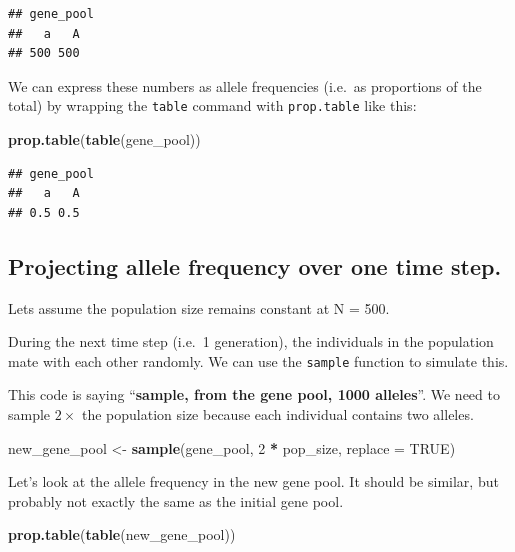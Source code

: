 \documentclass[
  a4paper]{book}
\newenvironment{Shaded}{\begin{snugshade}}{\end{snugshade}}
\newcommand{\AttributeTok}[1]{\textcolor[rgb]{0.13,0.29,0.53}{#1}}
\newcommand{\ConstantTok}[1]{\textcolor[rgb]{0.56,0.35,0.01}{#1}}
\newcommand{\DecValTok}[1]{\textcolor[rgb]{0.00,0.00,0.81}{#1}}
\newcommand{\FunctionTok}[1]{\textcolor[rgb]{0.13,0.29,0.53}{\textbf{#1}}}
\newcommand{\NormalTok}[1]{#1}
\newcommand{\OtherTok}[1]{\textcolor[rgb]{0.56,0.35,0.01}{#1}}
\newcommand{\SpecialCharTok}[1]{\textcolor[rgb]{0.81,0.36,0.00}{\textbf{#1}}}
\begin{document}
\begin{verbatim}
## gene_pool
##   a   A 
## 500 500
\end{verbatim}

We can express these numbers as allele frequencies (i.e.~as proportions of the total) by wrapping the \texttt{table} command with \texttt{prop.table} like this:

\begin{Shaded}
\begin{Highlighting}[]
\FunctionTok{prop.table}\NormalTok{(}\FunctionTok{table}\NormalTok{(gene\_pool))}
\end{Highlighting}
\end{Shaded}

\begin{verbatim}
## gene_pool
##   a   A 
## 0.5 0.5
\end{verbatim}

\hypertarget{projecting-allele-frequency-over-one-time-step.}{%
\subsection{Projecting allele frequency over one time step.}\label{projecting-allele-frequency-over-one-time-step.}}

Lets assume the population size remains constant at N = 500.

During the next time step (i.e.~1 generation), the individuals in the population mate with each other randomly. We can use the \texttt{sample} function to simulate this.

This code is saying ``\textbf{sample, from the gene pool, 1000 alleles}''. We need to sample \(2 \times\) the population size because each individual contains two alleles.

\begin{Shaded}
\begin{Highlighting}[]
\NormalTok{new\_gene\_pool }\OtherTok{\textless{}{-}} \FunctionTok{sample}\NormalTok{(gene\_pool, }\DecValTok{2} \SpecialCharTok{*}\NormalTok{ pop\_size, }\AttributeTok{replace =} \ConstantTok{TRUE}\NormalTok{)}
\end{Highlighting}
\end{Shaded}

Let's look at the allele frequency in the new gene pool. It should be similar, but probably not exactly the same as the initial gene pool.

\begin{Shaded}
\begin{Highlighting}[]
\FunctionTok{prop.table}\NormalTok{(}\FunctionTok{table}\NormalTok{(new\_gene\_pool))}
\end{Highlighting}
\end{Shaded}
\end{document}
